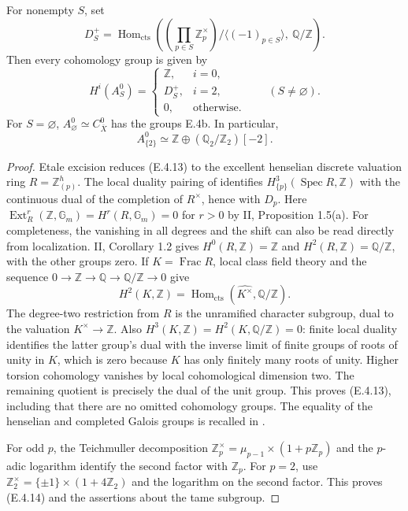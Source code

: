 For nonempty $S$, set
\[
 D_S^+=\operatorname{Hom}_{\mathrm{cts}}
 \left(
   \left(\prod_{p\in S}\mathbb Z_p^\times\right)/
                  \langle(-1)_{p\in S}\rangle,\ \mathbb Q/\mathbb Z
 \right).
\]
Then every cohomology group is given by
\[
 H^i(A_S^0)=
 \begin{cases}
  \mathbb Z,&i=0,\\
  D_S^+,&i=2,\\
  0,&\text{otherwise}.
 \end{cases}
 \qquad(S\ne\varnothing).
 \tag{E.4.15}
\]
For $S=\varnothing$, $A_\varnothing^0\simeq C_{\overline X}^0$
has the groups E.4b. In particular,
\[
 A_{\{2\}}^0\simeq
      \mathbb Z\oplus(\mathbb Q_2/\mathbb Z_2)[-2].
 \tag{E.4.16}
\]

\begin{proof}
Etale excision reduces (E.4.13) to the excellent henselian discrete
valuation ring $R=\mathbb Z_{(p)}^h$. The local duality pairing
of \citet[II, Theorem 1.8, with its pairing defined on p.~152]{D_MilneADT2006}
identifies $H^3_{\{p\}}(\operatorname{Spec}R,\mathbb Z)$ with the
continuous dual of the completion of $R^\times$, hence with $D_p$.
Here $\operatorname{Ext}^r_R(\mathbb Z,\mathbb G_m)
=H^r(R,\mathbb G_m)=0$ for $r>0$ by II, Proposition 1.5(a).
For completeness, the vanishing in all degrees and the shift can also
be read directly from localization. II, Corollary 1.2 gives
$H^0(R,\mathbb Z)=\mathbb Z$ and $H^2(R,\mathbb Z)=\mathbb Q/\mathbb Z$,
with the other groups zero. If $K=\operatorname{Frac}R$, local class
field theory and the sequence
$0\to\mathbb Z\to\mathbb Q\to\mathbb Q/\mathbb Z\to0$ give
\[
 H^2(K,\mathbb Z)
   =\operatorname{Hom}_{\mathrm{cts}}(\widehat{K^\times},
                                      \mathbb Q/\mathbb Z).
\]
The degree-two restriction from $R$ is the unramified character
subgroup, dual to the valuation $K^\times\to\mathbb Z$.
Also $H^3(K,\mathbb Z)=H^2(K,\mathbb Q/\mathbb Z)=0$:
finite local duality identifies the latter group's dual with the
inverse limit of finite groups of roots of unity in $K$, which is
zero because $K$ has only finitely many roots of unity.
Higher torsion cohomology vanishes by local cohomological dimension
two. The remaining quotient is precisely the dual of the unit
group. This proves (E.4.13), including that there are no omitted
cohomology groups. The equality of the henselian and completed
Galois groups is recalled in
\citet[I, proof of Theorem 2.14, pp.~36--37]{D_MilneADT2006}.

For odd $p$, the Teichmuller decomposition
$\mathbb Z_p^\times=\mu_{p-1}\times(1+p\mathbb Z_p)$ and the
$p$-adic logarithm identify the second factor with $\mathbb Z_p$.
For $p=2$, use
$\mathbb Z_2^\times=\{\pm1\}\times(1+4\mathbb Z_2)$ and the
logarithm on the second factor. This proves (E.4.14) and the
assertions about the tame subgroup.


\end{proof}
